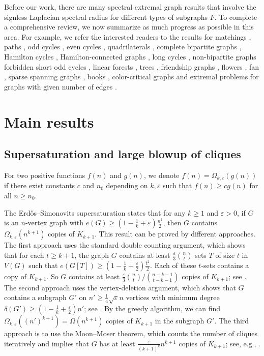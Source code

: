 \documentclass[11pt,a4paper]{article}
\theoremstyle{plain}
\theoremstyle{definition}
\begin{document}
Before our work, there are many spectral extremal graph  results that involve the signless Laplacian spectral radius for different types of subgraphs $F$. 
To complete a comprehensive review, 
we now summarize as much progress as possible in this area. 
For example, we refer the interested readers to the results for matchings \cite{Yu2008}, 
paths \cite{NY1}, odd cycles \cite{Y2014}, even cycles \cite{NY2}, 
quadrilaterals \cite{FNP2013},  
complete bipartite graphs \cite{FNP2016}, 
Hamilton cycles \cite{LN2016,LLP2018}, 
Hamilton-connected graphs \cite{ZWL2020}, 
long cycles \cite{CWZ2022}, 
non-bipartite graphs forbidden short odd cycles \cite{LMX2022,MLX2022}, 
linear forests \cite{CLZ2020}, trees \cite{CLZ2022}, 
friendship graphs \cite{ZHG2021}, 
flowers \cite{CZ}, fan \cite{WZ2023}, 
sparse spanning graphs \cite{LN2023}, 
books \cite{CJZ2025}, color-critical graphs \cite{ZLL2025} and extremal problems for graphs with given number of edges \cite{LGW2021,ZXL2020,ZXL2022}.  



\section{Main results}  
\label{sec-2}

\subsection{Supersaturation and large blowup of cliques}


For two positive functions $f(n)$ and $g(n)$, we denote $f(n)= \Omega_{k,\varepsilon}(g(n))$ if there exist constants $c$ and $n_0$ depending on $k,\varepsilon$ such that $f(n)\ge cg(n)$ for all $n\ge n_0$. 

The Erd\H{o}s--Simonovits  supersaturation \cite{ES1983-super} states that for any $k\ge 1$ and $\varepsilon>0$, if $G$ is an $n$-vertex graph with $e(G)\ge (1- \frac{1}{k} + \varepsilon) \frac{n^2}{2}$, then $G$ 
contains $\Omega_{k,\varepsilon} (n^{k+1})$ copies of $K_{k+1}$. 
This result can be proved by different approaches. The first approach uses the standard double counting argument, which shows that for each $t\ge k+1$, the graph $G$ contains at least $\frac{\varepsilon}{3} \binom{n}{t}$ sets $T$ of size $t$ in $V(G)$ such that 
$e(G[T]) \ge (1-\frac{1}{k} + \frac{\varepsilon}{2} ) 
\frac{t^2}{2}$. Each of these $t$-sets contains a copy of $K_{k+1}$. So $G$ contains at least $\frac{\varepsilon}{3} 
\binom{n}{t} \big/ 
\binom{n- k-1}{t-k-1 }$ copies of $K_{k+1}$; see \cite[Lemma 2.1]{Kee2011}. 
The second approach uses the vertex-deletion argument, which shows that $G$ contains a subgraph $G'$ on $n'\ge  \frac{1}{4}\sqrt{\varepsilon}n$ vertices with  minimum degree $\delta (G')\ge (1-\frac{1}{k}+\frac{\varepsilon }{2})n'$; see \cite[Proposition 4.2]{Kee2011}. 
By the greedy algorithm, we can find $\Omega_{k,\varepsilon}((n')^{k+1})=\Omega (n^{k+1})$ copies of $K_{k+1}$ in the subgraph $G'$.  
The third approach is to use the Moon--Moser theorem, which counts the number of cliques iteratively and implies that $G$ has at least $\frac{\varepsilon}{(k+1)^k} n^{k+1}$ copies of $K_{k+1}$; see, e.g., \cite{Niki2008blms}.  
\end{document}
